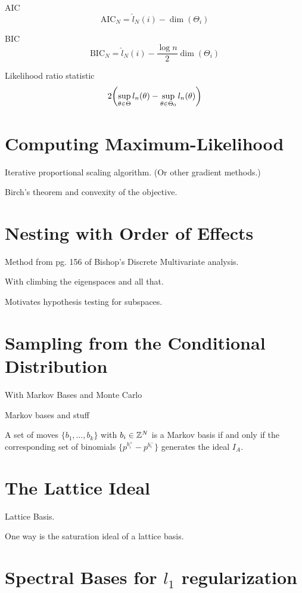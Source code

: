 \documentclass[cclicense]{hmcthesis}
\numberwithin{equation}{chapter}
\numberwithin{thmcounter}{chapter}
\begin{document}
    AIC
    \[
        \mathrm{AIC}_N = \hat l_N(i) - \dim(\Theta_i)
    \]
    
    BIC
    \[
        \mathrm{BIC}_N = \hat l_N(i) - \frac{\log n}{2}\dim(\Theta_i)
    \]

    Likelihood ratio statistic
    \[
        2\pdel*{\sup_{\theta \in \Theta} l_n(\theta) - \sup_{\theta \in \Theta_0}
        l_n(\theta)}
    \]


\section{Computing Maximum-Likelihood}

    Iterative proportional scaling algorithm. (Or other gradient methods.)

    Birch's theorem and convexity of the objective.

\section{Nesting with Order of Effects}
    Method from pg. 156 of Bishop's Discrete Multivariate analysis.

    With climbing the eigenspaces and all that.

    Motivates hypothesis testing for subspaces.

\section{Sampling from the Conditional Distribution}

    With Markov Bases and Monte Carlo

    Markov bases and stuff
    \begin{theorem}
        A set of moves $\{b_1, \ldots, b_k\}$ with $b_i \in \mathbb{Z}^N$ is a Markov basis
        if and only if the corresponding set of binomials $\{p^{b_i^+} -
        p^{b_i^-}\}$ generates the ideal $I_A$.
    \end{theorem}

\section{The Lattice Ideal}

    Lattice Basis.

    One way is the saturation ideal of a lattice basis.

\section{Spectral Bases for $l_1$ regularization}
\end{document}
